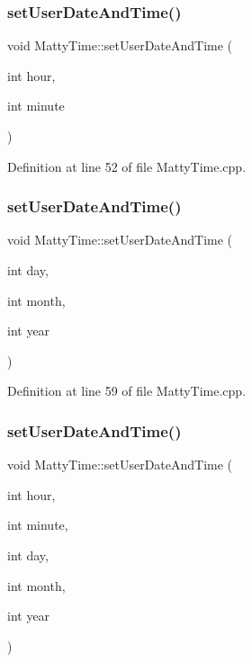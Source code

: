 \subsubsection{\texorpdfstring{set\+User\+Date\+And\+Time()}{setUserDateAndTime()}\hspace{0.1cm}{\footnotesize\ttfamily [2/5]}}
{\footnotesize\ttfamily void Matty\+Time\+::set\+User\+Date\+And\+Time (\begin{DoxyParamCaption}\item[{int}]{hour,  }\item[{int}]{minute }\end{DoxyParamCaption})}



Definition at line 52 of file Matty\+Time.\+cpp.

\hypertarget{classMattyTime_ac6d00b726df1a8c493452dfc52332f6f}{}\label{classMattyTime_ac6d00b726df1a8c493452dfc52332f6f} 
\subsubsection{\texorpdfstring{set\+User\+Date\+And\+Time()}{setUserDateAndTime()}\hspace{0.1cm}{\footnotesize\ttfamily [3/5]}}
{\footnotesize\ttfamily void Matty\+Time\+::set\+User\+Date\+And\+Time (\begin{DoxyParamCaption}\item[{int}]{day,  }\item[{int}]{month,  }\item[{int}]{year }\end{DoxyParamCaption})}



Definition at line 59 of file Matty\+Time.\+cpp.

\hypertarget{classMattyTime_a34af1776506d7a99387db16982987e1c}{}\label{classMattyTime_a34af1776506d7a99387db16982987e1c} 
\subsubsection{\texorpdfstring{set\+User\+Date\+And\+Time()}{setUserDateAndTime()}\hspace{0.1cm}{\footnotesize\ttfamily [4/5]}}
{\footnotesize\ttfamily void Matty\+Time\+::set\+User\+Date\+And\+Time (\begin{DoxyParamCaption}\item[{int}]{hour,  }\item[{int}]{minute,  }\item[{int}]{day,  }\item[{int}]{month,  }\item[{int}]{year }\end{DoxyParamCaption})}



